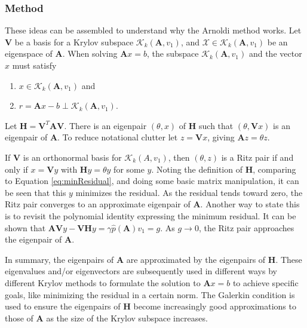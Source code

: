 \documentclass[12pt]{article}
\newcommand{\ve}[1]{\ensuremath{\mathbf{#1}}}
\begin{document}
\subsubsection*{Method}
These ideas can be assembled to understand why the Arnoldi method works. Let $\ve{V}$ be a basis for a Krylov subspace $\mathcal{K}_{k}(\ve{A},v_{1})$, and $\mathcal{X} \in \mathcal{K}_{k}(\ve{A},v_{1})$ be an eigenspace of $\ve{A}$. When solving $\ve{A}x = b$, the subspace $\mathcal{K}_{k}(\ve{A},v_{1})$ and the vector $x$ must satisfy
\begin{enumerate}
  \item $x \in \mathcal{K}_{k}(\ve{A},v_{1})$ and
  \item $r = \ve{A}x - b \perp \mathcal{K}_{k}(\ve{A},v_{1})$. 
\end{enumerate} 
%
Let $\ve{H} = \ve{V}^{T}\ve{AV}$. There is an eigenpair $(\theta, x)$ of $\ve{H}$ such that $(\theta, \ve{V}x)$ is an eigenpair of $\ve{A}$. To reduce notational clutter let $z = \ve{V}x$, giving $\ve{A}z = \theta z$.%

If $\ve{V}$ is an orthonormal basis for  $\mathcal{K}_{k}(A,v_{1})$, then $(\theta, z)$ is a Ritz pair if and only if $x = \ve{V}y$ with $\ve{H}y = \theta y$ for some $y$. Noting the definition of $\ve{H}$, comparing to Equation \eqref{eq:minResidual}, and doing some basic matrix manipulation, it can be seen that this $y$ minimizes the residual. As the residual tends toward zero, the Ritz pair converges to an approximate eigenpair of $\ve{A}$. %
Another way to state this is to revisit the polynomial identity expressing the minimum residual. It can be shown that $\ve{AV}y - \ve{VH}y = \gamma \hat{p}(\ve{A})v_{1} = g$. As $g \to 0$, the Ritz pair approaches the eigenpair of $\ve{A}$.%

In summary, the eigenpairs of $\ve{A}$ are approximated by the eigenpairs of $\ve{H}$. These eigenvalues and/or eigenvectors are subsequently used in different ways by different Krylov methods to formulate the solution to $\ve{A}x = b$ to achieve specific goals, like minimizing the residual in a certain norm. The Galerkin condition is used to ensure the eigenpairs of $\ve{H}$ become increasingly good approximations to those of $\ve{A}$ as the size of the Krylov subspace increases. 
\end{document}
